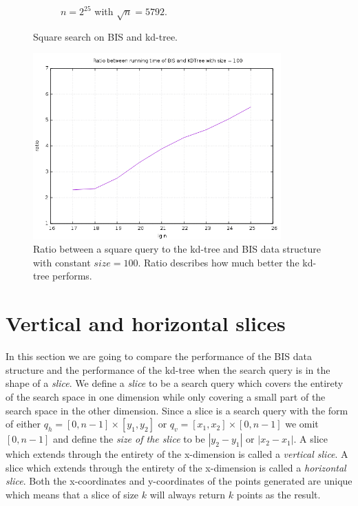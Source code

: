 \begin{figure}[h]
{\begin{subfigure}[b]{0.68\textwidth}
        \caption{$n = 2^{25}$ with $\sqrt{n} = 5792$.}
        \label{fig:sqrt_25}
    \end{subfigure}
  }
    \caption{Square search on BIS and kd-tree.}
    \label{fig:sqrt_17_25}
  
\end{figure}

\begin{figure}[h]
    \centering
    \includegraphics[width = 0.85\textwidth]{pictures/analysis/factor_difference_sqrtn_100.png}
    \caption{Ratio between a square query to the kd-tree and BIS data structure with constant $size = 100$. Ratio describes how much better the kd-tree performs.}\label{fig:factdiffsqrt100}
\end{figure}

\clearpage


\section{Vertical and horizontal slices}
\label{sect:slices}

In this section we are going to compare the performance of the BIS data structure and the performance of the kd-tree when the search query is in the shape of a \emph{slice}. We define a \emph{slice} to be a search query which covers the entirety of the search space in one dimension while only covering a small part of the search space in the other dimension. Since a slice is a search query with the form of either $q_h = [0, n-1] \times [y_1, y_2]$ or $q_v = [x_1, x_2] \times [0, n-1]$ we omit $[0, n-1]$ and define the \emph{size of the slice} to be $\left| y_2-y_1\right|$ or $\left|x_2-x_1\right|$. A slice which extends through the entirety of the x-dimension is called a \emph{vertical slice}. A slice which extends through the entirety of the x-dimension is called a \emph{horizontal slice}. Both the x-coordinates and y-coordinates of the points generated are unique which means that a slice of size $k$ will always return $k$ points as the result.

